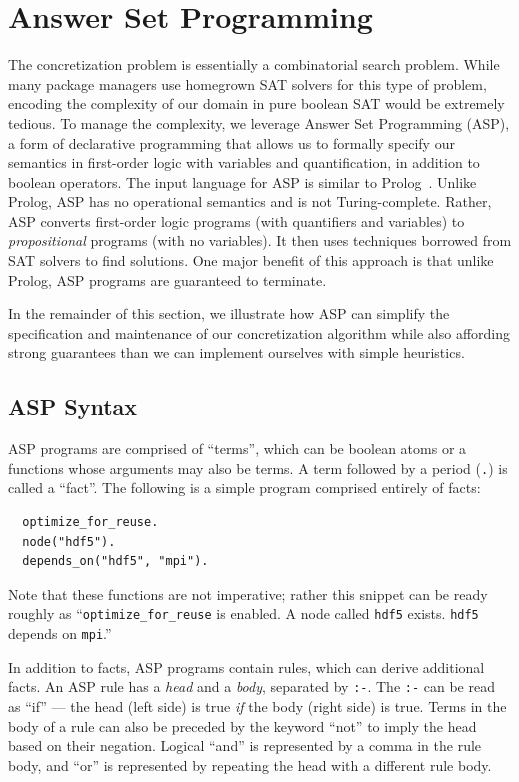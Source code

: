 \section{Answer Set Programming}
\label{sec:asp}

The concretization problem is essentially a combinatorial search problem. While many
package managers use homegrown SAT solvers for this type of problem, encoding the
complexity of our domain in pure boolean SAT would be extremely tedious. To manage the
complexity, we leverage Answer Set Programming (ASP), a form of declarative programming
that allows us to formally specify our semantics in first-order logic with variables and
quantification, in addition to boolean operators. The input language for ASP is similar
to Prolog~\cite{baral_2003}. Unlike Prolog, ASP has no operational semantics and is not
Turing-complete. Rather, ASP converts first-order logic programs (with quantifiers and
variables) to {\it propositional} programs (with no variables). It then uses techniques
borrowed from SAT solvers to find solutions. One major benefit of this approach is that
unlike Prolog, ASP programs are guaranteed to terminate.

In the remainder of this section, we illustrate how ASP can simplify the specification
and maintenance of our concretization algorithm while also affording strong guarantees
than we can implement ourselves with simple heuristics.

\subsection{ASP Syntax}

ASP programs are comprised of ``terms'', which can be boolean atoms or a functions whose
arguments may also be terms. A term followed by a period ({\tt .}) is called a ``fact''.
The following is a simple program comprised entirely of facts:
\begin{verbatim}
  optimize_for_reuse.
  node("hdf5").
  depends_on("hdf5", "mpi").
\end{verbatim}
Note that these functions are not imperative; rather this snippet can be ready roughly
as ``{\tt optimize\_for\_reuse} is enabled. A node called {\tt hdf5} exists. {\tt hdf5} depends on {\tt mpi}.''

In addition to facts, ASP programs contain rules, which can derive additional facts. An
ASP rule has a {\it head} and a {\it body}, separated by \texttt{:-}. The \texttt{:-}
can be read as ``if'' --- the head (left side) is true {\it if} the body (right side) is true.
Terms in the body of a rule can also be preceded by the keyword ``not'' to imply the
head based on their negation. Logical ``and'' is represented by a comma in the rule
body, and ``or'' is represented by repeating the head with a different rule body.

